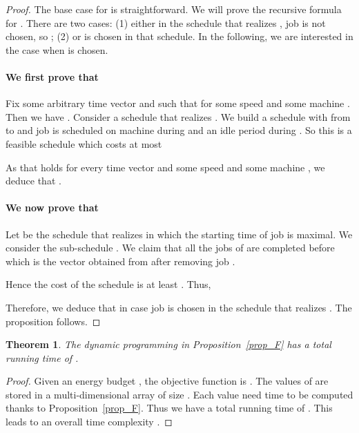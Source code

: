 \documentclass[11pt,a4paper]{article}
\newtheorem{theorem}{Theorem}
\begin{document}
\begin{proof}

The base case for  is straightforward. We will prove the recursive formula 
for . There are two cases: (1) either in the schedule
that realizes , job  is not chosen, so 
; 
(2) or  is chosen in that schedule. In the following, we are interested 
in the case when  is chosen.

\paragraph{We first prove that }
Fix some arbitrary time vector   and  such that
 for some 
speed  and some machine .
Then we have .
Consider a schedule  that realizes .
We build a schedule with  from  to  
and job  is scheduled on machine 
during  
and an idle period during . 
So this is a feasible schedule which costs at most 

As that holds for every time vector 
and some speed  and some machine , we deduce that 
.


\paragraph{We now prove that }
Let  be the schedule that realizes  in which
the starting time of job  is maximal.
We consider the sub-schedule .
We claim that all the jobs of  
are completed before  which
is the vector obtained from  after removing job .

Hence the cost of the schedule 
 is at least . Thus,

Therefore, we deduce that  in case job  is chosen in the schedule that realizes . The proposition follows.
\end{proof}



\begin{theorem}\label{prop_complexity_agreeable}
The dynamic programming in Proposition~\ref{prop_F} has a total running time of .
\end{theorem}


\begin{proof}
Given an energy budget , the objective function is
.
The values of  are stored in a multi-dimensional array of
size .
Each value need  time to be computed thanks to Proposition~\ref{prop_F}.
Thus we have a total running time of .
This leads to an overall time complexity  .
\end{proof}
\end{document}
